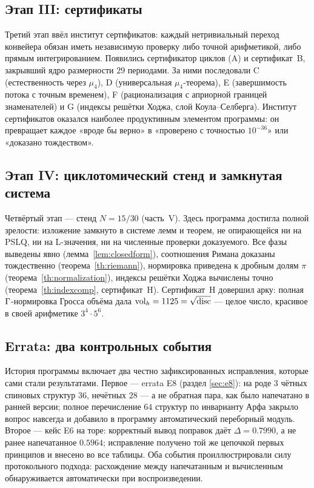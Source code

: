 \subsection{Этап III: сертификаты}

Третий этап ввёл институт сертификатов: каждый нетривиальный переход
конвейера обязан иметь независимую проверку либо точной арифметикой,
либо прямым интегрированием. Появились сертификатор циклов (A) и
сертификат~B, закрывший ядро размерности $29$ периодами. За ними
последовали C (естественность через $\mu_4$), D (универсальная
$\mu_4$-теорема), E (завершимость потока с точным временем),
F (рационализация с априорной границей знаменателей) и G (индексы
решётки Ходжа, слой Коула--Селберга). Институт сертификатов оказался
наиболее продуктивным элементом программы: он превращает каждое
«вроде бы верно» в «проверено с точностью $10^{-36}$» или
«доказано тождеством».

\subsection{Этап IV: циклотомический стенд и замкнутая система}

Четвёртый этап --- стенд $N=15/30$ (часть~V). Здесь программа
достигла полной зрелости: изложение замкнуто в системе лемм и теорем,
не опирающейся ни на PSLQ, ни на L-значения, ни на численные проверки
доказуемого. Все фазы выведены явно (лемма~\ref{lem:closedform}),
соотношения Римана доказаны тождественно
(теорема~\ref{th:riemann}), нормировка приведена к дробным долям
$\pi$ (теорема~\ref{th:normalization}), индексы решётки Ходжа
вычислены точно (теорема~\ref{th:indexcomp},
сертификат~H). Сертификат~H довершил арку: полная $\Gamma$-нормировка
Гросса объёма дала $\mathrm{vol}_h=1125=\sqrt{\operatorname{disc}}$ --- целое
число, красивое в своей арифметике $3^4\cdot5^6$.

\subsection{Errata: два контрольных события}

История программы включает два честно зафиксированных исправления,
которые сами стали результатами. Первое --- errata E8 (раздел
\ref{sec:e8}): на роде $3$ чётных спиновых структур $36$, нечётных $28$ —
а не обратная пара, как было напечатано в ранней версии; полное перечисление
$64$ структур по инварианту Арфа закрыло вопрос навсегда и добавило
в программу автоматический переборный модуль. Второе --- кейс E6
на торе: корректный вывод поправок даёт $\Delta=0.7990$, а не
ранее напечатанное $0.5964$; исправление получено той же цепочкой
первых принципов и внесено во все таблицы. Оба события
проиллюстрировали силу протокольного подхода: расхождение между
напечатанным и вычисленным обнаруживается автоматически при
воспроизведении.


